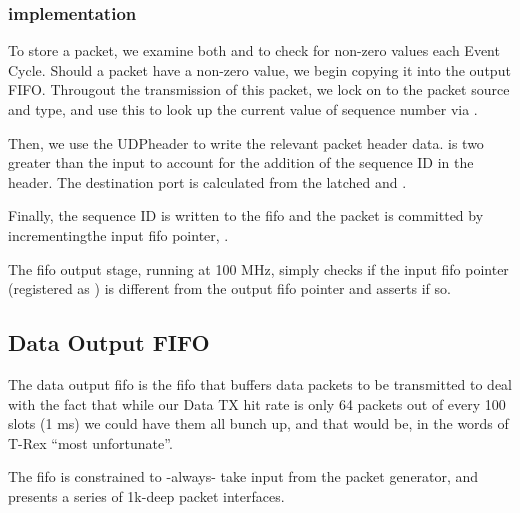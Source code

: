 \subsubsection{implementation}
To store a packet, we examine both  and
 to check for non-zero values each Event Cycle.
Should a packet have a non-zero value, we begin copying it into the
output FIFO. Througout the transmission of this packet, we lock on to
the packet source and type, and use this to look up the current value
of sequence number via  .

Then, we use the UDPheader to write the relevant packet header data.
 is two greater than the input  to
account for the addition of the sequence ID in the header. The
destination port is calculated from the latched  and
.

Finally, the sequence ID is written to the fifo and the packet is
committed by incrementingthe input fifo pointer, .

The fifo output stage, running at 100 MHz, simply checks if the input
fifo pointer (registered as ) is different from the
output fifo pointer and asserts  if so.

\subsection{Data Output FIFO}
The data output fifo is the fifo that buffers data packets to be
transmitted to deal with the fact that while our Data TX hit rate is
only 64 packets out of every 100 slots (1 ms) we could have them all
bunch up, and that would be, in the words of T-Rex ``most
unfortunate''.

The fifo is constrained to -always- take input from the packet
generator, and presents a series of 1k-deep packet interfaces.




